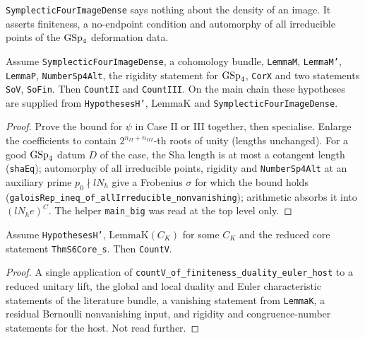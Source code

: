 \begin{remark}\label{sha:rem-sp4name}
\texttt{SymplecticFourImageDense} says nothing about the density of an image. It asserts
finiteness, a no-endpoint condition and automorphy of all irreducible points of the
$\mathrm{GSp}_4$ deformation data.
\end{remark}

\begin{theorem}\label{sha:count23}
Assume \texttt{SymplecticFourImageDense}, a cohomology bundle, \texttt{LemmaM},
\texttt{LemmaM'}, \texttt{LemmaP}, \texttt{NumberSp4Alt}, the rigidity statement for $\mathrm{GSp}_4$,
\texttt{CorX} and two statements \texttt{SoV}, \texttt{SoFin}. Then \texttt{CountII} and
\texttt{CountIII}. On the main chain these hypotheses are supplied from \texttt{HypothesesH'},
$\mathrm{LemmaK}$ and \texttt{SymplecticFourImageDense}.
\end{theorem}
\begin{proof}
Prove the bound for $\psi$ in Case II or III together, then specialise. Enlarge the
coefficients to contain $2^{n_{II}+n_{III}}$-th roots of unity (lengths unchanged). For a
good $\mathrm{GSp}_4$ datum $D$ of the case, the Sha length is at most a cotangent length
(\texttt{shaEq}); automorphy of all irreducible points, rigidity and \texttt{NumberSp4Alt} at
an auxiliary prime $p_0\nmid lN_h$ give a Frobenius $\sigma$ for which the bound holds
(\texttt{galoisRep\_ineq\_of\_allIrreducible\_nonvanishing}); arithmetic absorbs it into
$(lN_he)^C$. The helper \texttt{main\_big} was read at the top level only.
\end{proof}

\begin{theorem}[Case V]\label{sha:countv}
Assume \texttt{HypothesesH'}, $\mathrm{LemmaK}(C_K)$ for some $C_K$ and the reduced core
statement \texttt{ThmS6Core\_s}. Then \texttt{CountV}.
\end{theorem}
\begin{proof}
A single application of \texttt{countV\_of\_finiteness\_duality\_euler\_host} to a reduced
unitary lift, the global and local duality and Euler characteristic statements of the
literature bundle, a vanishing statement from \texttt{LemmaK}, a residual Bernoulli
nonvanishing input, and rigidity and congruence-number statements for the host. Not read
further.
\end{proof}

